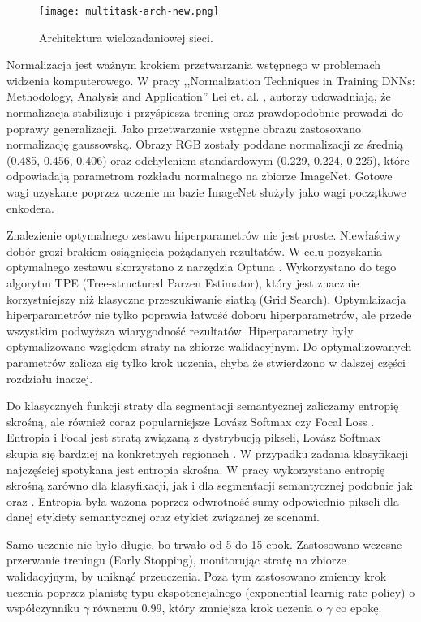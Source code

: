 \begin{figure}[ht!]
\centering
\texttt{[image: multitask-arch-new.png]}
\caption{Architektura wielozadaniowej sieci.}
\label{fig:multitask}
\end{figure}

Normalizacja jest ważnym krokiem przetwarzania wstępnego w problemach widzenia komputerowego. W pracy ,,Normalization Techniques in Training DNNs: Methodology, Analysis and Application'' Lei et. al. \cite{huang2020normalization}, autorzy udowadniają, że normalizacja stabilizuje i przyśpiesza trening oraz prawdopodobnie prowadzi do poprawy generalizacji. Jako przetwarzanie wstępne obrazu zastosowano normalizację gaussowską. Obrazy RGB zostały poddane normalizacji ze średnią (0.485, 0.456, 0.406) oraz odchyleniem standardowym (0.229, 0.224, 0.225), które odpowiadają parametrom rozkładu normalnego na zbiorze ImageNet. Gotowe wagi uzyskane poprzez uczenie na bazie ImageNet służyły jako wagi początkowe enkodera.

Znalezienie optymalnego zestawu hiperparametrów nie jest proste. Niewłaściwy dobór grozi brakiem osiągnięcia pożądanych rezultatów. W celu pozyskania optymalnego zestawu skorzystano z narzędzia Optuna \cite{optuna_2019}. Wykorzystano do tego algorytm TPE (Tree-structured Parzen Estimator), który jest znacznie korzystniejszy niż klasyczne przeszukiwanie siatką (Grid Search). Optymlaizacja hiperparametrów nie tylko poprawia łatwość doboru hiperparametrów, ale przede wszystkim podwyższa wiarygodność rezultatów. Hiperparametry były optymalizowane względem straty na zbiorze walidacyjnym. Do optymalizowanych parametrów zalicza się tylko krok uczenia, chyba że stwierdzono w dalszej części rozdziału inaczej.

Do klasycznych funkcji straty dla segmentacji semantycznej zaliczamy entropię skrośną, ale również coraz popularniejsze Lov\'asz Softmax \cite{berman2018lovasz} czy Focal Loss \cite{jadon2020survey}. Entropia i Focal jest stratą związaną z dystrybucją pikseli, Lov\'asz Softmax skupia się bardziej na konkretnych regionach \cite{jadon2020survey}. W przypadku zadania klasyfikacji najczęściej spotykana jest entropia skrośna. W pracy wykorzystano entropię skrośną zarówno dla klasyfikacji, jak i dla segmentacji semantycznej podobnie jak \cite{mehta2018net} oraz \cite{9892852}. Entropia była ważona poprzez odwrotność sumy odpowiednio pikseli dla danej etykiety semantycznej oraz etykiet związanej ze scenami.

Samo uczenie nie było długie, bo trwało od 5 do 15 epok. Zastosowano wczesne przerwanie treningu (Early Stopping), monitorując stratę na zbiorze walidacyjnym, by uniknąć przeuczenia. Poza tym zastosowano zmienny krok uczenia poprzez planistę typu ekspotencjalnego (exponential learnig rate policy) o współczynniku $\gamma$ równemu 0.99, który zmniejsza krok uczenia o $\gamma$ co epokę.

